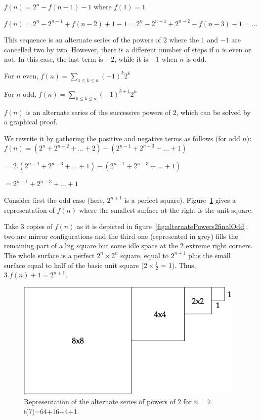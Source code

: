 $f(n) = 2^{n} - f(n-1) -1$ where $f(1)=1$

$f(n) = 2^{n} - 2^{n-1} + f(n-2) +1 -1 = 2^{n} - 2^{n-1} + 2^{n-2} - f(n-3) -1 = ...$

This sequence is an alternate series of the powers of $2$ where the $1$ and $-1$ are cancelled two by two.
However, there is a different number of steps if $n$ is even or not. 
In this case, the last term is $-2$, while it is $-1$ when $n$ is odd.
\bigskip

For $n$ even, $f(n) = \sum_{1 \leq k \leq n}(-1)^{k}2^{k} $

For $n$ odd, $f(n) = \sum_{0 \leq k \leq n}(-1)^{k+1}2^{k} $
\bigskip

$f(n)$ is an alternate series of the successive powers of $2$, which can be solved by a graphical proof.

We rewrite it by gathering the positive and negative terms as follows (for odd $n$): 
$f(n) = (2^{n} + 2^{n-2} + ... + 2) - (2^{n-1} + 2^{n-3} + ... + 1)$

$= 2.(2^{n-1} + 2^{n-3}  + ...  +1) - (2^{n-1} + 2^{n-3}  + ... + 1)$

$= 2^{n-1} + 2^{n-3}  + ...  +1$ 

Consider first the odd case (here, $2^{n+1}$ is a perfect square).
Figure~\ref{fig:alternatePowers2odd} gives a representation of $f(n)$ 
where the smallest surface at the right is the unit square.

Take 3 copies of $f(n)$ as it is depicted in figure~\ref{fig:alternatePowers2finalOdd},
two are mirror configurations and the third one (represented in grey) fills the remaining part of a big square but some idle space at the 2 extreme right corners. 
The whole surface is a perfect $2^{n} \times 2^{n}$ square, equal to $2^{n+1}$ plus the small surface equal to half of the basic unit square ($2 \times \frac{1}{2}$ = 1). Thus, $3.f(n)+1= 2^{n+1}$.

\begin{figure} [h]
\begin{center}
        \includegraphics[scale=0.4]{FiguresMaths/alternatePowers2initOdd.png}
        \caption{Representation of the alternate series of powers of $2$ for $n=7$.
        f(7)=64+16+4+1.}
        \label{fig:alternatePowers2odd}
\end{center}
\end{figure}

